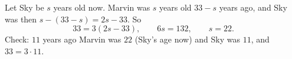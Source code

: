 Let Sky be $s$ years old now. Marvin was $s$ years old $33-s$ years ago, and Sky was then $s-(33-s)=2s-33$. So
\[33=3(2s-33),\qquad 6s=132,\qquad s=\boxed{22}.\]
Check: $11$ years ago Marvin was $22$ (Sky's age now) and Sky was $11$, and $33=3\cdot11$.
